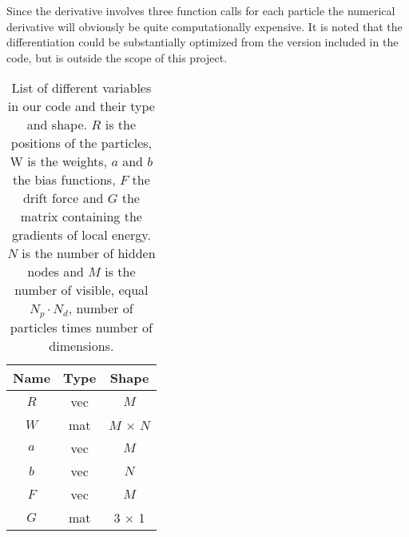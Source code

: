 Since the derivative involves three function calls for each particle the numerical derivative will obviously be quite computationally expensive. It is noted  that the differentiation could be substantially optimized from the version included in the code, but is outside the scope of this project. 

\begin{table}
    \centering
    \begin{tabular}{|c|c|c|}
    \hline
    Name   &  Type   &   Shape \\
    \hline
    $R$ & vec & $M$ \\
    $W$ & mat & $M$ $\times$ $N$ \\
    $a$ & vec & $M$ \\
    $b$ & vec & $N$ \\
    $F$ & vec & $M$ \\
    $G$ & mat & 3 $\times$ 1 \\
    \hline
    \end{tabular}
    \caption{List of different variables in our code and their type and shape. $R$ is the positions of the particles, W is the weights, $a$ and $b$ the bias functions, $F$ the drift force and $G$ the matrix containing the gradients of local energy. $N$ is the number of hidden nodes and $M$ is the number of visible, equal $N_p \cdot N_d$, number of particles times number of dimensions.}
    \label{tab:variables}
\end{table} 